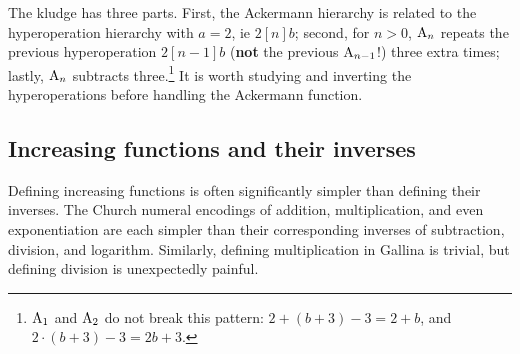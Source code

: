 The kludge has three parts. First, the Ackermann hierarchy is related 
to the hyperoperation hierarchy with $a=2$, ie $2[n]b$; 
second, for $n>0$, $\text{A}_n$ repeats the previous hyperoperation $2[n-1]b$
{\color{magenta}(\textbf{not} the previous $\text{A}_{n-1}$!)} three extra times; 
lastly, $\text{A}_n$ subtracts three.\footnote{$\text{A}_{1}$ and $\text{A}_{2}$ do not break this pattern: $2 + (b + 3) - 3 = 2 + b$, and $2 \cdot (b + 3) - 3 = 2b + 3$.}
It is worth studying and inverting the hyperoperations before handling the Ackermann function.





\subsection{Increasing functions and their inverses}
Defining increasing functions is often significantly simpler than defining their inverses.
The Church numeral encodings of addition, multiplication, and even exponentiation
are each simpler than their corresponding inverses of subtraction, division, and logarithm. Similarly, defining multiplication in Gallina is trivial, but defining division is unexpectedly painful.\\[5pt]

